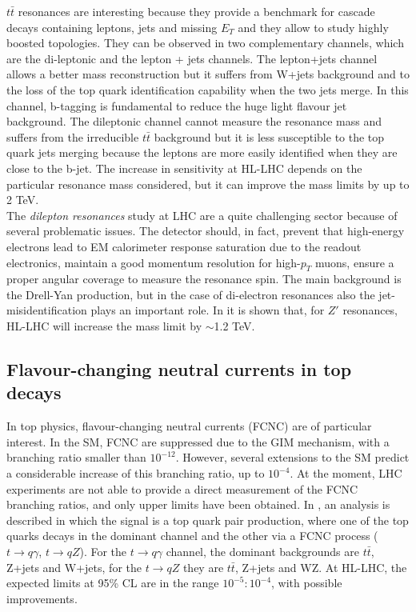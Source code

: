\documentclass[a4paper,twoside,12pt]{article}
\begin{document}
$t\bar{t}$ resonances are interesting because they provide a benchmark for cascade
decays containing leptons, jets and missing $E_T$ and they allow to study highly boosted
topologies. They can be observed in two complementary channels, which are the di-leptonic and the lepton + jets channels.  The lepton+jets channel allows a better mass reconstruction but it suffers
from W+jets background and to the loss of the top quark identification capability when the two jets merge. In this channel, b-tagging is fundamental to reduce the huge light flavour jet
background. The dileptonic channel cannot measure the resonance mass and suffers from the irreducible $t\bar{t}$ background but
it is less susceptible to the top quark jets merging because the leptons are more easily 
identified when they are close to the b-jet.  The increase in sensitivity at HL-LHC depends
on the particular resonance mass considered, but it can improve the mass limits by up to
2 TeV.\\

The \textit{dilepton resonances} study at LHC are a quite challenging sector because of
several problematic issues. The detector should, in fact, prevent that high-energy electrons lead to EM calorimeter
response saturation due to the readout electronics, maintain a good momentum resolution for high-$p_T$ muons, ensure a proper angular coverage to measure the resonance spin. The main background is the Drell-Yan production, but in the 
case of di-electron resonances also the jet-misidentification plays an important role. In \cite{loi}
it is shown that, for $Z'$ resonances, HL-LHC will increase the mass limit by $\sim$1.2 TeV.

\subsection{Flavour-changing neutral currents in top decays}
In top physics, flavour-changing neutral currents (FCNC) are of particular interest.
In the SM, FCNC are suppressed due to the GIM mechanism, with a branching ratio smaller
than $10^{-12}$. However, several extensions to the SM predict a considerable increase of this branching ratio, up to $10^{-4}$. At the moment, LHC experiments are not able to provide a direct measurement of the FCNC branching ratios, and only upper limits have been obtained. 
In \cite{loi}, an analysis is described in which the signal is a top quark pair production, where
one of the top quarks decays in the dominant channel and the other via a FCNC process 
($t \rightarrow q\gamma$, $t \rightarrow qZ$). For the $t \rightarrow q\gamma$ channel, 
the dominant backgrounds are $t\bar{t}$, Z+jets and W+jets, for the $t \rightarrow qZ$ they are $t\bar{t}$, Z+jets and WZ. At HL-LHC, the expected limits at 95\% CL are in the range
$10^{-5} : 10^{-4}$, with possible improvements. 
\end{document}
